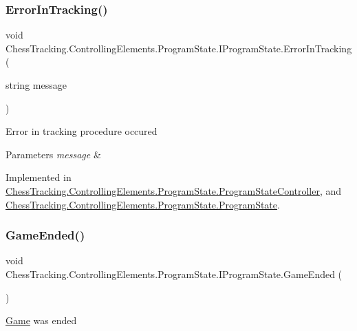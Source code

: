 \subsubsection{\texorpdfstring{ErrorInTracking()}{ErrorInTracking()}}
{\footnotesize\ttfamily void Chess\+Tracking.\+Controlling\+Elements.\+Program\+State.\+I\+Program\+State.\+Error\+In\+Tracking (\begin{DoxyParamCaption}\item[{string}]{message }\end{DoxyParamCaption})}



Error in tracking procedure occured 


\begin{DoxyParams}{Parameters}
{\em message} & \\
\hline
\end{DoxyParams}


Implemented in \mbox{\hyperlink{class_chess_tracking_1_1_controlling_elements_1_1_program_state_1_1_program_state_controller_adff6e8fc8dff0a594286ae35b59d416c}{Chess\+Tracking.\+Controlling\+Elements.\+Program\+State.\+Program\+State\+Controller}}, and \mbox{\hyperlink{class_chess_tracking_1_1_controlling_elements_1_1_program_state_1_1_program_state_a696ede3bce5b54db8f0d2dd9e7d8eabb}{Chess\+Tracking.\+Controlling\+Elements.\+Program\+State.\+Program\+State}}.

\mbox{\label{interface_chess_tracking_1_1_controlling_elements_1_1_program_state_1_1_i_program_state_afb709d1cfd4782712e5e23e54fc3ad28}} 
\subsubsection{\texorpdfstring{GameEnded()}{GameEnded()}}
{\footnotesize\ttfamily void Chess\+Tracking.\+Controlling\+Elements.\+Program\+State.\+I\+Program\+State.\+Game\+Ended (\begin{DoxyParamCaption}{ }\end{DoxyParamCaption})}



\mbox{\hyperlink{namespace_chess_tracking_1_1_game}{Game}} was ended 



